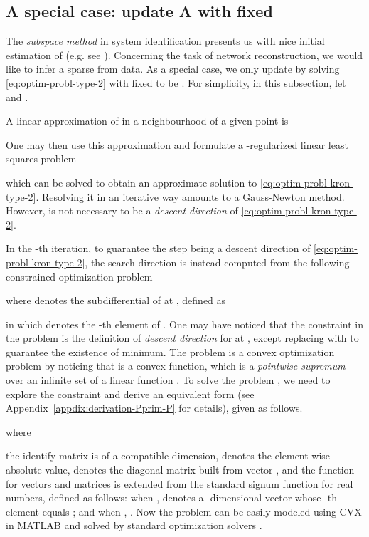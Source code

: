 \documentclass[letterpaper,10pt,journal,final]{IEEEtran}
\theoremstyle{definition}
\theoremstyle{remark}
\begin{document}
\subsection{A special case: update A with fixed }
\label{subsec:special-case:-update-A}

The \emph{subspace method} in system identification presents us with nice
initial estimation of  (e.g. see \cite{Viberg2002}). Concerning the
task of network reconstruction, we would like to infer a sparse  from
data. As a special case, we only update  by solving
\eqref{eq:optim-probl-type-2} with  fixed to be . For simplicity, in
this subsection, let
 and .

A linear approximation of  in a neighbourhood of a given point  is

One may then use this approximation and formulate a -regularized linear least squares problem

which can be solved to obtain an approximate solution to \eqref{eq:optim-probl-kron-type-2}.
Resolving it in an iterative way amounts to a Gauss-Newton method. However,  is not necessary to be a \emph{descent direction} of \eqref{eq:optim-probl-kron-type-2}.

In the -th iteration, to guarantee the step  being a descent direction of \eqref{eq:optim-probl-kron-type-2}, the search direction  is instead computed from the following constrained optimization problem

where  denotes the subdifferential of  at , defined as


in which  denotes the -th element of .
One may have noticed that the constraint in the problem  is the definition of \emph{descent direction} for  at , except replacing  with  to guarantee the existence of minimum. The problem  is a convex optimization problem by noticing that  is a convex function, which is a \emph{pointwise supremum} over an infinite set of a linear function \cite[chap.~3]{Boyd2004}.
To solve the problem , we need to explore the constraint and derive an equivalent form (see Appendix~\ref{appdix:derivation-Pprim-P} for details), given as follows.

where

the identify matrix  is of a compatible dimension,  denotes the element-wise absolute value,  denotes the diagonal matrix built from vector , and the  function for vectors and matrices is extended from the standard signum function for real numbers, defined as follows: when ,  denotes a -dimensional vector whose -th element equals ; and when , .
Now the problem  can be easily modeled using CVX in MATLAB and solved by
standard optimization solvers \cite{cvx-manual}.
\end{document}
